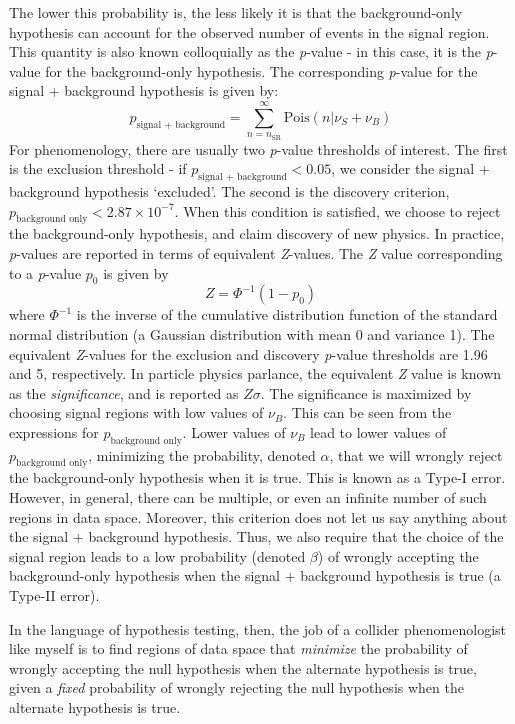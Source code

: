 The lower this probability is, the less likely it is that the background-only hypothesis can account for the observed number of events in the signal region. This quantity is also known colloquially as the \emph{p}-value - in this case, it is the \emph{p}-value for the background-only hypothesis. The corresponding \emph{p}-value for the signal + background hypothesis is given by:
\[p_\text{signal + background} = \sum_{n=n_\text{SR}}^\infty \text{Pois}(n|\nu_S + \nu_B)\]
For phenomenology, there are usually two \emph{p}-value thresholds of interest. The first is the exclusion threshold - if $p_\text{signal + background} < 0.05$, we consider the signal + background hypothesis `excluded'. The second is the discovery criterion, $p_\text{background only} < 2.87\times 10^{-7}$. When this condition is satisfied, we choose to reject the background-only hypothesis, and claim discovery of new physics. In practice, \emph{p}-values are reported in terms of equivalent \emph{Z}-values. The \emph{Z} value corresponding to a \emph{p}-value $p_0$ is given by
\[Z = \Phi^{-1}(1-p_0)\]
where $\Phi^{-1}$ is the inverse of the cumulative distribution function of the standard normal distribution (a Gaussian distribution with mean 0 and variance 1). The equivalent \emph{Z}-values for the exclusion and discovery \emph{p}-value thresholds are 1.96 and 5, respectively. In particle physics parlance, the equivalent \emph{Z} value is known as the \emph{significance}, and is reported as $Z\sigma$.
The significance is maximized by choosing signal regions with low values of $\nu_B$.
This can be seen from the expressions for $p_\text{background only}$. Lower values of $\nu_B$ lead to lower values of $p_\text{background only}$, minimizing the probability, denoted $\alpha$, that we will wrongly reject the background-only hypothesis when it is true. This is known as a Type-I error. However, in general, there can be multiple, or even an infinite number of such regions in data space. Moreover, this criterion does not let us say anything about the signal + background hypothesis. Thus, we also require that the choice of the signal region leads to a low probability (denoted $\beta$) of wrongly accepting the background-only hypothesis when the signal + background hypothesis is true (a Type-II error).

In the language of hypothesis testing, then, the job of a collider phenomenologist like myself is to find regions of data space that \emph{minimize} the probability of wrongly accepting the null hypothesis when the alternate hypothesis is true, given a \emph{fixed} probability of wrongly rejecting the null hypothesis when the alternate hypothesis is true.

